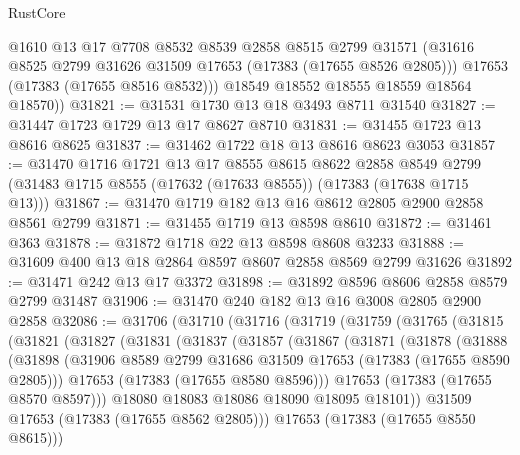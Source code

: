 \begin{lexlean}{RustCore}
\begin{coremodule}
          @1610
          @13
          @17
          @7708
          @8532
          @8539
          @2858
          @8515
          @2799
          @31571
          (@31616 @8525 @2799 @31626 @31509 @17653 (@17383 (@17655 @8526 @2805)))
          @17653
          (@17383 (@17655 @8516 @8532)))
        @18549
        @18552
        @18555
        @18559
        @18564
        @18570))
@31821 := @31531 @1730 @13 @18 @3493 @8711 @31540
@31827 := @31447 @1723 @1729 @13 @17 @8627 @8710
@31831 := @31455 @1723 @13 @8616 @8625
@31837 := @31462 @1722 @18 @13 @8616 @8623 @3053
@31857 := @31470
    @1716
    @1721
    @13
    @17
    @8555
    @8615
    @8622
    @2858
    @8549
    @2799
    (@31483 @1715 @8555 (@17632 (@17633 @8555)) (@17383 (@17638 @1715 @13)))
@31867 := @31470 @1719 @182 @13 @16 @8612 @2805 @2900 @2858 @8561 @2799
@31871 := @31455 @1719 @13 @8598 @8610
@31872 := @31461 @363
@31878 := @31872 @1718 @22 @13 @8598 @8608 @3233
@31888 := @31609 @400 @13 @18 @2864 @8597 @8607 @2858 @8569 @2799 @31626
@31892 := @31471 @242 @13 @17 @3372
@31898 := @31892 @8596 @8606 @2858 @8579 @2799 @31487
@31906 := @31470 @240 @182 @13 @16 @3008 @2805 @2900 @2858
@32086 := @31706
    (@31710
      (@31716
        (@31719
          (@31759
            (@31765
              (@31815
                (@31821
                  (@31827
                    (@31831
                      (@31837
                        (@31857
                          (@31867
                            (@31871
                              (@31878
                                (@31888
                                  (@31898
                                    (@31906
                                      @8589
                                      @2799
                                      @31686
                                      @31509
                                      @17653
                                      (@17383 (@17655 @8590 @2805)))
                                    @17653
                                    (@17383 (@17655 @8580 @8596)))
                                  @17653
                                  (@17383 (@17655 @8570 @8597)))
                                @18080
                                @18083
                                @18086
                                @18090
                                @18095
                                @18101))
                            @31509
                            @17653
                            (@17383 (@17655 @8562 @2805)))
                          @17653
                          (@17383 (@17655 @8550 @8615)))

\end{coremodule}
\end{lexlean}

